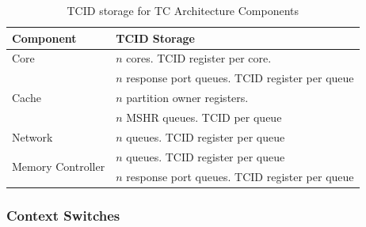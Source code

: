 \begin{table}
\begin{center}
    \begin{footnotesize}
\begin{tabular}{l|l}
    \hline
    Component & TCID Storage \\
    \hline
    Core & $n$ cores. TCID register per core. \\
    \hline
    \multirow{3}{*}{Cache}
    & $n$ response port queues. TCID register per queue \\
    & $n$ partition owner registers. \\
    & $n$ MSHR queues. TCID per queue\\
    \hline
    Network & $n$ queues. TCID register per queue\\
    \hline
    \multirow{2}{*}{Memory Controller}
    & $n$ queues. TCID register per queue \\
    & $n$ response port queues. TCID register per queue\\
    \hline
\end{tabular}
    \end{footnotesize}
    \caption{TCID storage for TC Architecture Components}
    \label{table:tcid}
\end{center}
\end{table}


\subsubsection{Context Switches}


